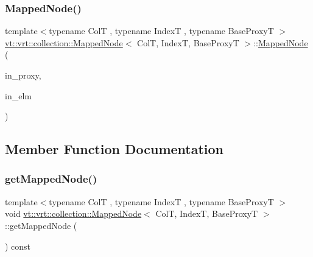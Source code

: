 \mbox{\label{structvt_1_1vrt_1_1collection_1_1_mapped_node_af4c4a7b812aafea44d727c3901bf3f85}} 
\subsubsection{\texorpdfstring{Mapped\+Node()}{MappedNode()}\hspace{0.1cm}{\footnotesize\ttfamily [2/2]}}
{\footnotesize\ttfamily template$<$typename ColT , typename IndexT , typename Base\+ProxyT $>$ \\
\hyperlink{structvt_1_1vrt_1_1collection_1_1_mapped_node}{vt\+::vrt\+::collection\+::\+Mapped\+Node}$<$ ColT, IndexT, Base\+ProxyT $>$\+::\hyperlink{structvt_1_1vrt_1_1collection_1_1_mapped_node}{Mapped\+Node} (\begin{DoxyParamCaption}\item[{typename Base\+Proxy\+T\+::\+Proxy\+Type const \&}]{in\+\_\+proxy,  }\item[{typename Base\+Proxy\+T\+::\+Element\+Proxy\+Type const \&}]{in\+\_\+elm }\end{DoxyParamCaption})}



\subsection{Member Function Documentation}
\mbox{\label{structvt_1_1vrt_1_1collection_1_1_mapped_node_a06312fd72cdc20a1b9671846426ec571}} 
\subsubsection{\texorpdfstring{get\+Mapped\+Node()}{getMappedNode()}}
{\footnotesize\ttfamily template$<$typename ColT , typename IndexT , typename Base\+ProxyT $>$ \\
void \hyperlink{structvt_1_1vrt_1_1collection_1_1_mapped_node}{vt\+::vrt\+::collection\+::\+Mapped\+Node}$<$ ColT, IndexT, Base\+ProxyT $>$\+::get\+Mapped\+Node (\begin{DoxyParamCaption}{ }\end{DoxyParamCaption}) const}

